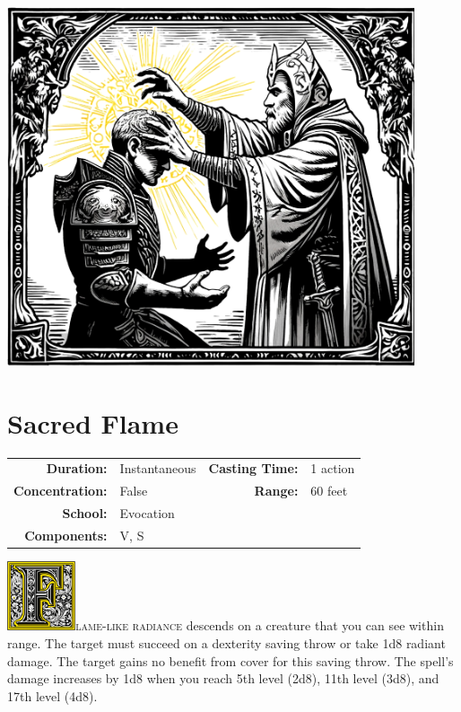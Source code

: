 \documentclass[12pt,showtrims]{memoir}
\begin{document}
\vfill
\begin{center}
    \includegraphics[width=0.9\textwidth]{spell_artwork/resistance.png}
\end{center}

\newpage
\section*{Sacred Flame}

{
\small\centering\vspace{-6pt}
\begin{tabular}{rlrl}
\toprule

\textbf{Duration:} & Instantaneous &
\textbf{Casting Time:} & 1 action \\
\textbf{Concentration:} & False &
\textbf{Range:} & 60 feet \\
\textbf{School:} & Evocation \\
\textbf{Components:} & \multicolumn{3}{p{0.7\textwidth}}{V, S}\\

\bottomrule
\end{tabular}
}

\vspace{1\baselineskip}\noindent 
\lettrine[lines=4]{\includegraphics[height=58pt]{initials/F.png}}{lame-like radiance} descends on a creature that you can see within range. The target must succeed on a dexterity saving throw or take 1d8 radiant damage. The target gains no benefit from cover for this saving throw. The spell's damage increases by 1d8 when you reach 5th level (2d8), 11th level (3d8), and 17th level (4d8).
\end{document}
